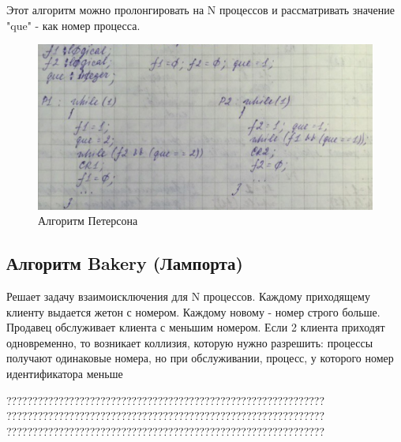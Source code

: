 Этот алгоритм можно пролонгировать на N процессов и рассматривать значение "que" - как номер процесса.

\begin{figure}[H]
    \centering
    \includegraphics[width=\textwidth]{listing/4.png}
    \caption{Алгоритм Петерсона}
\end{figure}

\subsection{Алгоритм Bakery (Лампорта)}

Решает задачу взаимоисключения для N процессов. Каждому приходящему клиенту выдается жетон с номером. Каждому новому - номер строго больше. Продавец обслуживает клиента с меньшим номером. Если 2 клиента приходят одновременно, то возникает коллизия, которую нужно разрешить: процессы получают одинаковые номера, но при обслуживании, процесс, у которого номер идентификатора меньше

?????????????????????????????????????????????????????????????\\
?????????????????????????????????????????????????????????????\\
?????????????????????????????????????????????????????????????\\


